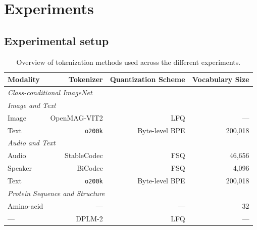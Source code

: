 \section{Experiments}
\label{sec:exp}

\subsection{Experimental setup}
\label{sec:exp:setup}

\begin{table}[t]
\centering
\small
\setlength{\tabcolsep}{4.5pt}
\begin{tabular}{lrrr}
\toprule
\textbf{Modality} & \textbf{Tokenizer} & \textbf{Quantization Scheme} & \textbf{Vocabulary Size} \\
\midrule
\multicolumn{4}{l}{\emph{Class-conditional ImageNet}} \\

\midrule
\multicolumn{4}{l}{\emph{Image and Text}} \\
Image & OpenMAG-VIT2 \citep{image:magvit2} & LFQ & --- \\
Text & \texttt{o200k} & Byte-level BPE & 200{,}018 \\
\midrule
\multicolumn{4}{l}{\emph{Audio and Text}} \\
Audio & StableCodec \citep{audio:stablecodec} & FSQ & 46{,}656 \\
Speaker & BiCodec \citep{audio:spark-tts} & FSQ & 4{,}096 \\
Text & \texttt{o200k} & Byte-level BPE & 200{,}018 \\
\midrule
\multicolumn{4}{l}{\emph{Protein Sequence and Structure}} \\
Amino-acid & --- & --- & 32 \\
--- & DPLM-2 \citep{protein:dplm2} & LFQ & --- \\
\bottomrule
\end{tabular}
\caption{Overview of tokenization methods used across the different experiments.}
\label{tab:tokenizers}
\end{table}





